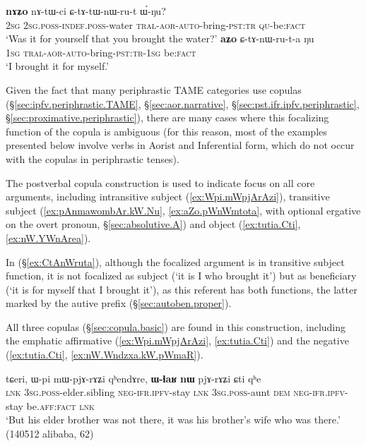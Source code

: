 \begin{exe}
\ex  \label{ex:CkAnWru}
\begin{xlist}
\ex \label{ex:CtAtWnWrut}
\gll \textbf{nɤʑo} nɤ-tɯ-ci ɕ-tɤ-tɯ-nɯ-ru-t ɯ́-ŋu? \\
\textsc{2sg} \textsc{2sg}.\textsc{poss}-\textsc{indef}.\textsc{poss}-water \textsc{tral}-\textsc{aor}-\textsc{auto}-bring-\textsc{pst}:\textsc{tr}  \textsc{qu}-be:\textsc{fact} \\
\glt `Was it for yourself that you brought the water?'
\ex \label{ex:CtAnWruta}
\gll \textbf{aʑo} ɕ-tɤ-nɯ-ru-t-a ŋu \\
\textsc{1sg} \textsc{tral}-\textsc{aor}-\textsc{auto}-bring-\textsc{pst}:\textsc{tr}-\textsc{1sg} be:\textsc{fact} \\
\glt `I brought it for myself.'
\end{xlist}
\end{exe}


Given the fact that many periphrastic TAME categories use copulas (§\ref{sec:ipfv.periphrastic.TAME}, §\ref{sec:aor.narrative}, §\ref{sec:pst.ifr.ipfv.periphrastic}, §\ref{sec:proximative.periphrastic}), there are many cases where this focalizing function of the copula is ambiguous (for this reason, most of the examples presented below involve verbs in Aorist and Inferential form, which do not occur with the copulas in periphrastic tenses). 


The postverbal copula construction is used to indicate focus on all core arguments, including intransitive subject (\ref{ex:Wpi.mWpjArAzi}), transitive subject (\ref{ex:pAnmawombAr.kW.Nu}, \ref{ex:aZo.pWnWmtota}, with optional ergative on the overt pronoun, §\ref{sec:absolutive.A}) and object (\ref{ex:tutia.Cti}, \ref{ex:nW.YWnArea}). 

In (§\ref{ex:CtAnWruta}), although the focalized argument is in transitive subject function, it is not focalized as subject (`it is I who brought it') but as beneficiary (`it is for myself that I brought it'), as this referent has both functions, the latter marked by the autive prefix  (§\ref{sec:autoben.proper}).

All three copulas (§\ref{sec:copula.basic}) are found in this construction, including the emphatic affirmative  (\ref{ex:Wpi.mWpjArAzi}, \ref{ex:tutia.Cti}) and the negative  (\ref{ex:tutia.Cti}, \ref{ex:nW.Wndzxa.kW.pWmaR}).

\begin{exe}
\ex \label{ex:Wpi.mWpjArAzi}
\gll tɕeri, ɯ-pi mɯ-pjɤ-rɤʑi qʰendɤre,  \textbf{ɯ-ɬaʁ} \textbf{nɯ} pjɤ-rɤʑi ɕti qʰe  \\
\textsc{lnk} \textsc{3sg}.\textsc{poss}-elder.sibling \textsc{neg}-\textsc{ifr}.\textsc{ipfv}-stay \textsc{lnk} \textsc{3sg}.\textsc{poss}-aunt \textsc{dem} \textsc{neg}-\textsc{ifr}.\textsc{ipfv}-stay be.\textsc{aff}:\textsc{fact} \textsc{lnk} \\
\glt  `But his elder brother was not there, it was his brother's wife who was there.' (140512 alibaba, 62)
\end{exe}

